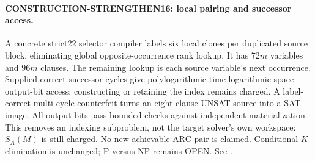 \paragraph{CONSTRUCTION-STRENGTHEN16: local pairing and successor access.}
A concrete strict22 selector compiler labels six local clones per duplicated
source block, eliminating global opposite-occurrence rank lookup.
It has $72m$ variables and $96m$ clauses. The remaining lookup is each
source variable's next occurrence. Supplied correct successor cycles give
polylogarithmic-time logarithmic-space output-bit access; constructing or
retaining the index remains charged. A label-correct multi-cycle counterfeit
turns an eight-clause UNSAT source into a SAT image.
All output bits pass bounded checks against independent materialization.
This removes an indexing subproblem, not the target solver's own workspace:
$S_A(M)$ is still charged. No new achievable ARC pair is claimed.
Conditional $K$ elimination is unchanged; P versus NP remains OPEN.
See .
